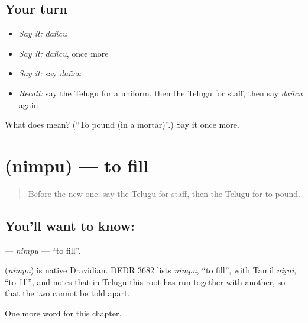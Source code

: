 \subsection*{Your turn}
\begin{itemize}
\raggedright
  \item \emph{Say it:} \emph{dañcu}
  \item \emph{Say it:} \emph{dañcu}, once more
  \item \emph{Say it:} say \emph{dañcu}
  \item \emph{Recall:} say the Telugu for a uniform, then the Telugu for staff, then say \emph{dañcu} again
\end{itemize}

\begin{tcolorbox}[breakable,colback=teal!4,colframe=teal!35!black,title={Before you move on}]
What does  mean? (\textquotedblleft{}To pound (in a mortar)\textquotedblright{}.) Say it once more.
\end{tcolorbox}
\section[\texorpdfstring{\te{నింపు} (nimpu)}{నింపు (nimpu)}]{ (nimpu) — to fill}

\label{lesson:TE-C199-nimpu}



\begin{quote}
Before the new one: say the Telugu for staff, then the Telugu for to pound.
\end{quote}

\subsection*{You'll want to know: }
\textbf{} — \emph{nimpu} — \textquotedblleft{}to fill\textquotedblright{}.

\begin{cousinweb}
\textbf{} (\emph{nimpu}) is native Dravidian. DEDR 3682 lists \emph{nimpu}, \textquotedblleft{}to fill\textquotedblright{}, with Tamil \emph{niṟai}, \textquotedblleft{}to fill\textquotedblright{}, and notes that in Telugu this root has run together with another, so that the two cannot be told apart.
\end{cousinweb}

\begin{grammarlens}[title={What you've built}]
One more word for this chapter.
\end{grammarlens}

